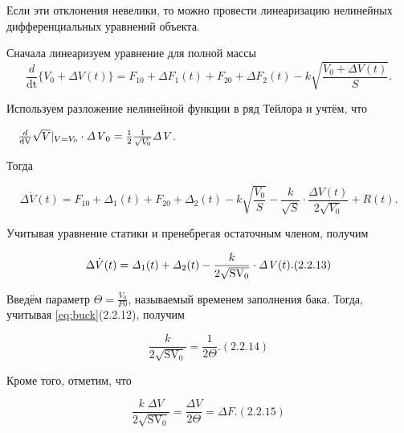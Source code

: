 		Если эти отклонения невелики, то можно провести линеаризацию нелинейных дифференциальных уравнений объекта.



		Снача­ла линеаризуем уравнение для полной массы
\begin{equation*}
\frac
d{{\text{dt}}}\{V_0+\mathit{\Delta  V}(t)\}=F_{10}+\mathit{\Delta  F}_1(t)+F_{20}+\mathit{\Delta  F}_2(t)-k\sqrt{\frac{V_0+\mathit{\Delta  V}(t)}
	S}.
\end{equation*}

		Используем разложение нелинейной функции в ряд Тейлора и учтём, что



	\ \  $\frac d{\normalsubformula{\text{dV}}}\sqrt V|_{V=V_0}\cdot \mathit{\Delta V}_0=\frac 1 2\frac 1{\sqrt{V_0}}\mathit{\Delta V}$.



		Тогда


\begin{equation*}
\Delta \dot V(t)=F_{10}+\mathit{\Delta  }_1(t)+F_{20}+\mathit{\Delta  }_2(t)-k\sqrt{\frac{V_0} S}-\frac k{\sqrt S}\cdot
\frac{\mathit{\Delta V}(t)}{2\sqrt{V_0}}+R(t).
\end{equation*}

		Учитывая уравнение статики и пренебрегая остаточным членом, получим



\begin{equation}\label{eq:2.2.13}
		\Delta \dot V(t)=\mathit{\Delta  }_1(t)+\mathit{\Delta  }_2(t)-\frac k{2\sqrt{\normalsubformula{\text{SV}}_0}}\cdot
		\mathit{\Delta V}(t). (2.2.13)
\end{equation}

		 Введём параметр  $\Theta=\frac{V_{0}}{F{0}}$, называемый временем заполнения бака. Тогда, учитывая \eqref{eq:buck}(2.2.12), получим

\begin{equation}\label{key}
		  \frac k{2\sqrt{\text{SV}_{0}}}=\frac 1{2\Theta }.  (2.2.14)
\end{equation}



		Кроме того, отметим, что 



\begin{equation}\label{key}
		  \frac{k\;\mathit{\Delta V}}{2\sqrt{\text{SV}_{0}}}=\frac{\mathit{\Delta V}}{2\Theta 
		  }=\mathit{\Delta F}.  (2.2.15)
\end{equation}

